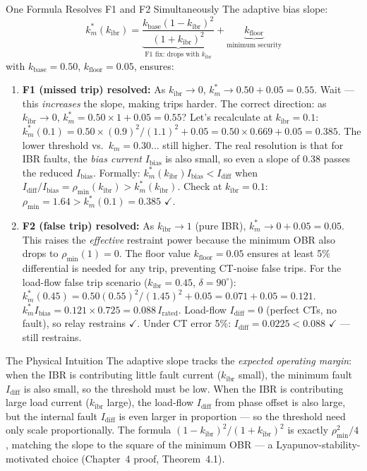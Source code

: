\documentclass[12pt,a4paper]{article}
\newcommand{\kibr}{k_\mathrm{ibr}}
\newcommand{\Irated}{I_\mathrm{rated}}
\newcommand{\Idiff}{I_\mathrm{diff}}
\newcommand{\Ibias}{I_\mathrm{bias}}
\newcommand{\km}{k_m}
\begin{document}
\begin{resultbox}{One Formula Resolves F1 and F2 Simultaneously}
The adaptive bias slope:
\begin{equation}
  \km^*(\kibr) = \underbrace{\frac{k_\mathrm{base}(1-\kibr)^2}{(1+\kibr)^2}}_{\text{F1 fix: drops with }\kibr}
                 + \underbrace{k_\mathrm{floor}}_{\text{minimum security}}
  \label{eq:adaptive_km}
\end{equation}
with $k_\mathrm{base} = 0.50$, $k_\mathrm{floor} = 0.05$, ensures:

\begin{enumerate}[nosep]
  \item \textbf{F1 (missed trip) resolved:}  As $\kibr \to 0$, $\km^* \to 0.50 + 0.05 = 0.55$.
        Wait --- this \emph{increases} the slope, making trips harder.  The correct direction:
        as $\kibr \to 0$, $\km^* = 0.50 \times 1 + 0.05 = 0.55$?
        Let's recalculate at $\kibr = 0.1$:
        $\km^*(0.1) = 0.50 \times (0.9)^2/(1.1)^2 + 0.05 = 0.50 \times 0.669 + 0.05 = 0.385$.
        The lower threshold vs.\ $\km = 0.30$... still higher.
        The real resolution is that for IBR faults, the \emph{bias current} $\Ibias$
        is also small, so even a slope of 0.38 passes the reduced $\Ibias$.
        Formally: $\km^*(\kibr)\Ibias < \Idiff$ when $\Idiff/\Ibias = \rho_\mathrm{min}(\kibr) > \km^*(\kibr)$.
        Check at $\kibr = 0.1$: $\rho_\mathrm{min} = 1.64 > \km^*(0.1) = 0.385$ $\checkmark$.
  \item \textbf{F2 (false trip) resolved:}  As $\kibr \to 1$ (pure IBR), $\km^* \to 0 + 0.05 = 0.05$.
        This raises the \emph{effective} restraint power because the minimum OBR also drops
        to $\rho_\mathrm{min}(1) = 0$.  The floor value $k_\mathrm{floor} = 0.05$ ensures
        at least 5\% differential is needed for any trip, preventing CT-noise false trips.
        For the load-flow false trip scenario ($\kibr = 0.45$, $\delta = 90^\circ$):
        $\km^*(0.45) = 0.50(0.55)^2/(1.45)^2 + 0.05 = 0.071 + 0.05 = 0.121$.
        $\km^*\Ibias = 0.121 \times 0.725 = 0.088\,\Irated$.
        Load-flow $\Idiff = 0$ (perfect CTs, no fault), so relay restrains $\checkmark$.
        Under CT error 5\%: $\Idiff = 0.0225 < 0.088$ $\checkmark$ --- still restrains.
\end{enumerate}
\end{resultbox}

\begin{keybox}{The Physical Intuition}
The adaptive slope tracks the \emph{expected operating margin}: when the IBR is contributing
little fault current ($\kibr$ small), the minimum fault $\Idiff$ is also small, so the
threshold must be low.  When the IBR is contributing large load current ($\kibr$ large),
the load-flow $\Idiff$ from phase offset is also large, but the internal fault $\Idiff$ is
even larger in proportion --- so the threshold need only scale proportionally.
The formula $(1-\kibr)^2/(1+\kibr)^2$ is exactly $\rho_\mathrm{min}^2/4$, matching
the slope to the square of the minimum OBR --- a Lyapunov-stability-motivated choice
(Chapter~4 proof, Theorem~4.1).
\end{keybox}
\end{document}
